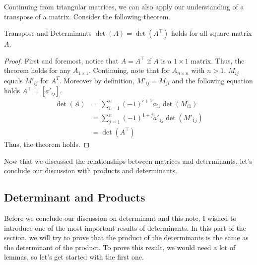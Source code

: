 \documentclass[../../main.tex]{subfiles}
\begin{document}
Continuing from triangular matrices, we can also apply our
understanding of a transpose of a matrix. Consider the following
theorem.

\begin{theorem}{}{Transpose and Determinants}
$\det(A) = \det(A^\intercal)$ holds for all square matrix $A$.
\end{theorem}
\begin{proof}
First and foremost, notice that $A = A^\intercal$ if $A$ is a
$1 \times 1$ matrix. Thus, the theorem holds for any $A_{1 \times 1}$.
Continuing, note that for $A_{n \times n}$ with $n > 1$, $M_{ij}$
equals $M'_{ij}$ for $A^T$. Moreover by definition, $M'_{ij} =
M_{ji}$ and the following equation holds $A^\intercal = [a'_{ij}]$.
\begin{align*}
    \det(A)
    &= \sum_{i=1}^n (-1)^{i + 1} a_{i1} \det(M_{i1}) \\
    &= \sum_{j=1}^n (-1)^{1 + j} a'_{1j} \det(M'_{1j}) \\
    &= \det\left( A^\intercal \right)
\end{align*}
Thus, the theorem holds.
\end{proof}

Now that we discussed the relationships between matrices and
determinants, let's conclude our discussion with products and
determinants.

\subsection{Determinant and Products}

Before we conclude our discussion on determinant and this note,
I wished to introduce one of the most important results of
determinants. In this part of the section, we will try to prove
that the product of the determinants is the same as the determinant
of the product. To prove this result, we would need a lot of lemmas,
so let's get started with the first one.
\end{document}
